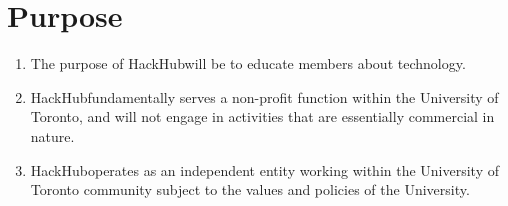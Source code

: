 \documentclass[12pt]{article}
\newcommand{\orgname}{HackHub\space}
\begin{document}
\section{Purpose}
\begin{enumerate}[{2}.1]
    \item	The purpose of \orgname will be to educate members about technology.
    \item \orgname fundamentally serves a non-profit function within the University of Toronto, and will not engage in activities that are essentially commercial in nature. 
    \item	\orgname operates as an independent entity working within the University of Toronto community subject to the values and policies of the University.  
\end{enumerate}


\end{document}
